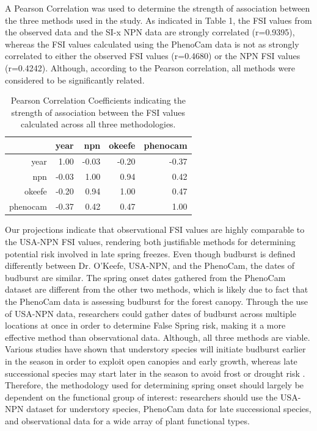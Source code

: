\documentclass{article}\usepackage[]{graphicx}\usepackage[]{color}
\begin{document}
A Pearson Correlation was used to determine the strength of association between the three methods used in the study. As indicated in Table 1, the FSI values from the observed data and the SI-x NPN data are strongly correlated (r=0.9395), whereas the FSI values calculated using the PhenoCam data is not as strongly correlated to either the observed FSI values (r=0.4680) or the NPN FSI values (r=0.4242). Although, according to the Pearson correlation, all methods were considered to be significantly related. 

\begin{table}[ht]
\centering
\caption{Pearson Correlation Coefficients indicating the strength of association between the FSI values calculated across all three methodologies.} 
\begin{tabular}{rrrrr}
  \hline
 & year & npn & okeefe & phenocam \\ 
  \hline
year & 1.00 & -0.03 & -0.20 & -0.37 \\ 
  npn & -0.03 & 1.00 & 0.94 & 0.42 \\ 
  okeefe & -0.20 & 0.94 & 1.00 & 0.47 \\ 
  phenocam & -0.37 & 0.42 & 0.47 & 1.00 \\ 
   \hline
\end{tabular}
\end{table}


Our projections indicate that observational FSI values are highly comparable to the USA-NPN FSI values, rendering both justifiable methods for determining potential risk involved in late spring freezes. Even though budburst is defined differently between Dr. O'Keefe, USA-NPN, and the PhenoCam, the dates of budburst are similar. The spring onset dates gathered from the PhenoCam dataset are different from the other two methods, which is likely due to fact that the PhenoCam data is assessing budburst for the forest canopy. Through the use of USA-NPN data, researchers could gather dates of budburst across multiple locations at once in order to determine False Spring risk, making it a more effective method than observational data. Although, all three methods are viable. Various studies have shown that understory species will initiate budburst earlier in the season in order to exploit open canopies and early growth, whereas late successional species may start later in the season to avoid frost or drought risk \citep{Xin2016, Richardson2009}. Therefore, the methodology used for determining spring onset should largely be dependent on the functional group of interest: researchers should use the USA-NPN dataset for understory species, PhenoCam data for late successional species, and observational data for a wide array of plant functional types. 
\end{document}
